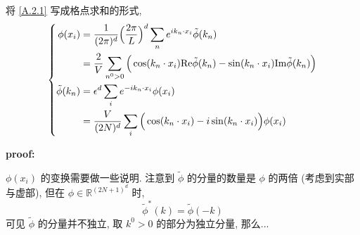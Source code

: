 \begin{itemize}
\begin{tcolorbox}[title=proof:]
		将 \eqref{A.2.1} 写成格点求和的形式,
		\begin{equation} \label{A.2.5}
			\begin{dcases}
				\begin{aligned}
					\phi(x_i) &= \frac{1}{(2 \pi)^d} \Big( \frac{2 \pi}{L} \Big)^d \sum_n e^{i k_n \cdot x_i} \tilde{\phi}(k_n) \\
					&= \frac{2}{V} \sum_{n^0 > 0} \Big( \cos(k_n \cdot x_i) \mathrm{Re} \tilde{\phi}(k_n) - \sin(k_n \cdot x_i) \mathrm{Im} \tilde{\phi}(k_n) \Big) \\
					\tilde{\phi}(k_n) &= \epsilon^d \sum_i e^{- i k_n \cdot x_i} \phi(x_i) \\
					&= \frac{V}{(2 N)^d} \sum_i \Big( \cos(k_n \cdot x_i) - i \sin(k_n \cdot x_i) \Big) \phi(x_i)
				\end{aligned}
			\end{dcases}
		\end{equation}
		
		\noindent\hdashrule[0.5ex]{\linewidth}{0.5pt}{1mm} %
		
		\textbf{proof:}
		
		$\phi(x_i)$ 的变换需要做一些说明. 注意到 $\tilde{\phi}$ 的分量的数量是 $\phi$ 的两倍 (考虑到实部与虚部), 但在 $\phi \in \mathbb{R}^{(2 N + 1)^d}$ 时,
		\begin{equation}
			\tilde{\phi}^*(k) = \tilde{\phi}(- k)
		\end{equation}
		可见 $\tilde{\phi}$ 的分量并不独立, 取 $k^0 > 0$ 的部分为独立分量, 那么...
		
		\noindent\hdashrule[0.5ex]{\linewidth}{0.5pt}{1mm} %
		

\end{tcolorbox}
\end{itemize}
